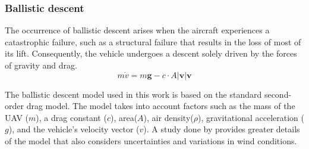 \documentclass[12pt]{report}
\begin{document}
        \subsubsection{Ballistic descent}
        The occurrence of ballistic descent arises when the aircraft experiences a catastrophic failure, such as a
        structural failure that results in the loss of most of its lift. Consequently, the vehicle undergoes a descent
        solely driven by the forces of gravity and drag.
        \begin{equation}
             m\dot{v} = m \mathbf{g} - c \cdot A \lvert \mathbf{v} \rvert \mathbf{v}
        \end{equation}
        
        The ballistic descent model used in this work is based on the standard second-order drag model. The model takes
        into account factors such as the mass of the UAV (\(m\)), a drag constant (\(c\)), area(\(A\)), air
        density(\(\rho\)), gravitational acceleration (\(g\)), and the vehicle's velocity vector (\(v\)). A study done by
        \cite{cour-harbo_ground_2020} provides greater details of the model that also considers uncertainties and variations in wind conditions.
\end{document}
